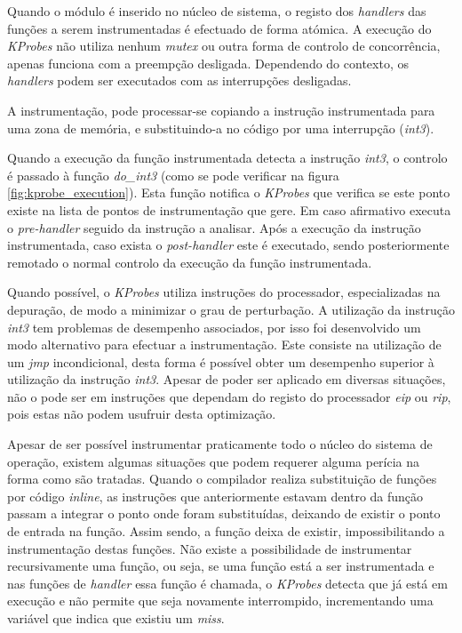 Quando o módulo é inserido no núcleo de sistema, o registo dos \textit{handlers} das funções a serem instrumentadas é efectuado de forma atómica.
A execução do \textit{KProbes} não utiliza nenhum \textit{mutex} ou outra forma de controlo de concorrência, apenas funciona com a preempção desligada.
Dependendo do contexto, os \textit{handlers} podem ser executados com as interrupções desligadas.

A instrumentação, pode processar-se copiando a instrução instrumentada para uma zona de memória, e substituindo-a no código por uma interrupção (\textit{int3}).

Quando a execução da função instrumentada detecta a instrução \textit{int3}, o controlo é passado à função \textit{do\_int3} (como se pode verificar na figura \ref{fig:kprobe_execution}).
Esta função notifica o \textit{KProbes} que verifica se este ponto existe na lista de pontos de instrumentação que gere.
Em caso afirmativo executa o \textit{pre-handler} seguido da instrução a analisar.
Após a execução da instrução instrumentada, caso exista o \textit{post-handler} este é executado, sendo posteriormente remotado o normal controlo da execução da função instrumentada.

Quando possível, o \textit{KProbes} utiliza instruções do processador, especializadas na depuração, de modo a minimizar o grau de perturbação.
A utilização da instrução \textit{int3} tem problemas de desempenho associados, por isso foi desenvolvido um modo alternativo para efectuar a instrumentação.
Este consiste na utilização de um \textit{jmp} incondicional, desta forma é possível obter um desempenho superior à utilização da instrução \textit{int3}.
Apesar de poder ser aplicado em diversas situações, não o pode ser em instruções que dependam do registo do processador \textit{eip} ou \textit{rip}, pois estas não podem usufruir desta optimização.

Apesar de ser possível instrumentar praticamente todo o núcleo do sistema de operação, existem algumas situações que podem requerer alguma perícia na forma como são tratadas.
Quando o compilador realiza substituição de funções por código \textit{inline}, as instruções que anteriormente estavam dentro da função passam a integrar o ponto onde foram substituídas, deixando de existir o ponto de entrada na função.
Assim sendo, a função deixa de existir, impossibilitando a instrumentação destas funções.
Não existe a possibilidade de instrumentar recursivamente uma função, ou seja, se uma função está a ser instrumentada e nas funções de \textit{handler} essa função é chamada, o \textit{KProbes} detecta que já está em execução e não permite que seja novamente interrompido, incrementando uma variável que indica que existiu um \textit{miss}.

